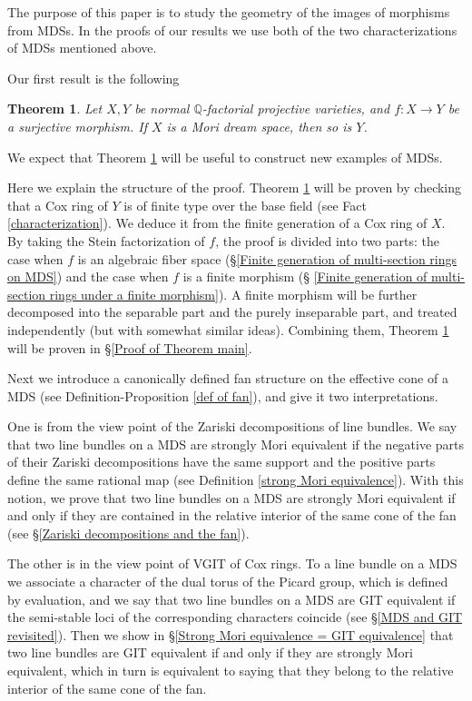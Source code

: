 \documentclass[12pt,twoside]{amsart}
\newtheorem{theo}{Theorem}[section]
\theoremstyle{definition}
\newcommand\bq{\mathbb{Q}}
\begin{document}
The purpose of this paper is to study the geometry of the images of morphisms from MDSs.
In the proofs of our results we use both of the two characterizations of MDSs mentioned above.

Our first result is the following

\begin{theo}\label{main}
Let $X,Y$ be normal $\bq$-factorial projective varieties, and $f: X\to Y$ be a surjective morphism.
If $X$ is a Mori dream space, then so is $Y$.
\end{theo}

We expect that Theorem \ref{main} will be useful to construct new examples of MDSs.

Here we explain the structure of the proof.
Theorem \ref{main} will be proven by checking that a Cox ring of $Y$ is of finite type over the base field
(see Fact \ref{characterization}).
We deduce it from the finite generation of a Cox ring of $X$. By taking the Stein factorization of
$f$, the proof is divided into two parts: the case when $f$ is an algebraic fiber space
(\S\ref{Finite generation of multi-section rings on MDS}) and the case when $f$ is a finite morphism (\S
\ref{Finite generation of multi-section rings under a finite morphism}).
A finite morphism will be further decomposed into the separable part and the purely inseparable part,
and treated independently (but with somewhat similar ideas). Combining them, Theorem \ref{main}
will be proven in \S\ref{Proof of Theorem main}.


Next we introduce a canonically defined fan structure on the effective cone of a MDS
(see Definition-Proposition \ref{def of fan}), and give it two interpretations.

One is from the view point of the Zariski decompositions of line bundles.
We say that two line bundles on a MDS are strongly Mori equivalent if the negative parts of their Zariski
decompositions have the same support and the positive parts define the same rational map
(see Definition \ref{strong Mori equivalence}). With this notion, we prove that
two line bundles on a MDS are strongly Mori equivalent if and only if they are contained in the
relative interior of the same cone of the fan (see \S\ref{Zariski decompositions and the fan}).

The other is in the view point of VGIT of Cox rings.
To a line bundle on a MDS we associate a character of the dual torus of the Picard group, which is
defined by evaluation, and we say that two line bundles on a MDS are GIT equivalent if
the semi-stable loci of the corresponding characters coincide (see \S\ref{MDS and GIT revisited}).
Then we show in \S\ref{Strong Mori equivalence = GIT equivalence} that two line bundles are GIT equivalent
if and only if they are strongly Mori equivalent, which in turn is equivalent to saying that they
belong to the relative interior of the same cone of the fan.
\end{document}

